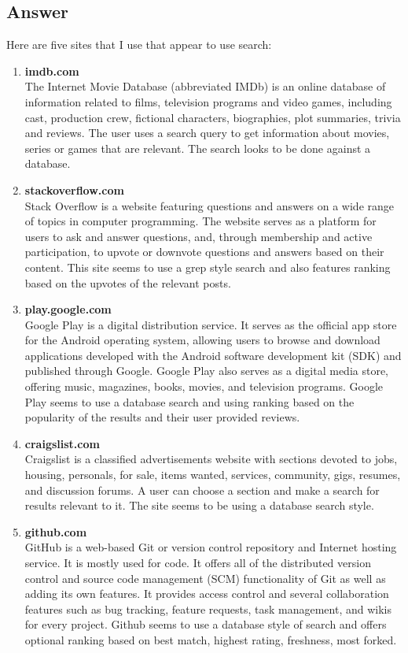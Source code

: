 \documentclass{article}
\begin{document}
\subsection*{Answer}
Here are five sites that I use that appear to use search:
\begin{enumerate}
	\item \textbf{imdb.com}\\
	The Internet Movie Database (abbreviated IMDb) is an online database of information related to films, television programs and video games, including cast, production crew, fictional characters, biographies, plot summaries, trivia and reviews. The user uses a search query to get information about movies, series or games that are relevant. The search looks to be done against a database.
	\item \textbf{stackoverflow.com}\\
	Stack Overflow is a website featuring questions and answers on a wide range of topics in computer programming. The website serves as a platform for users to ask and answer questions, and, through membership and active participation, to upvote or downvote questions and answers based on their content. This site seems to use a grep style search and also features ranking based on the upvotes of the relevant posts.
	\item \textbf{play.google.com}\\
	Google Play is a digital distribution service. It serves as the official app store for the Android operating system, allowing users to browse and download applications developed with the Android software development kit (SDK) and published through Google. Google Play also serves as a digital media store, offering music, magazines, books, movies, and television programs. Google Play seems to use a database search and using ranking based on the popularity of the results and their user provided reviews.
	\item \textbf{craigslist.com}\\
	Craigslist is a classified advertisements website with sections devoted to jobs, housing, personals, for sale, items wanted, services, community, gigs, resumes, and discussion forums. A user can choose a section and make a search for results relevant to it. The site seems to be using a database search style.
	\item \textbf{github.com}\\
	GitHub is a web-based Git or version control repository and Internet hosting service. It is mostly used for code. It offers all of the distributed version control and source code management (SCM) functionality of Git as well as adding its own features. It provides access control and several collaboration features such as bug tracking, feature requests, task management, and wikis for every project. Github seems to use a database style of search and offers optional ranking based on best match, highest rating, freshness, most forked.
	
\end{enumerate}
\end{document}
